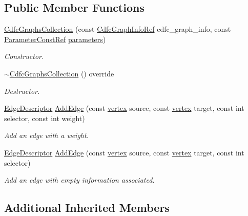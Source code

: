 \subsection*{Public Member Functions}
\begin{DoxyCompactItemize}
\item 
\hyperlink{classCdfcGraphsCollection_a20aad56ae7626fed60060372f4164f72}{Cdfc\+Graphs\+Collection} (const \hyperlink{cdfc__module__binding_8hpp_a3a026fb9b4dd23bdaed64df0cf832dd8}{Cdfc\+Graph\+Info\+Ref} cdfc\+\_\+graph\+\_\+info, const \hyperlink{Parameter_8hpp_a37841774a6fcb479b597fdf8955eb4ea}{Parameter\+Const\+Ref} \hyperlink{structgraphs__collection_adfc2ecaf0a04245a3cfd572c213ef1ed}{parameters})
\begin{DoxyCompactList}\small\item\em Constructor. \end{DoxyCompactList}\item 
\hyperlink{classCdfcGraphsCollection_a5fa5fc9fca56c45cc1e04f617cde2dc4}{$\sim$\+Cdfc\+Graphs\+Collection} () override
\begin{DoxyCompactList}\small\item\em Destructor. \end{DoxyCompactList}\item 
\hyperlink{graph_8hpp_a9eb9afea34e09f484b21f2efd263dd48}{Edge\+Descriptor} \hyperlink{classCdfcGraphsCollection_a4b3146e03cd71eb79f1f3015c3e6980f}{Add\+Edge} (const \hyperlink{graph_8hpp_abefdcf0544e601805af44eca032cca14}{vertex} source, const \hyperlink{graph_8hpp_abefdcf0544e601805af44eca032cca14}{vertex} target, const int selector, const int weight)
\begin{DoxyCompactList}\small\item\em Add an edge with a weight. \end{DoxyCompactList}\item 
\hyperlink{graph_8hpp_a9eb9afea34e09f484b21f2efd263dd48}{Edge\+Descriptor} \hyperlink{classCdfcGraphsCollection_a7d2016712fbb94f0d736c012b31f7ef3}{Add\+Edge} (const \hyperlink{graph_8hpp_abefdcf0544e601805af44eca032cca14}{vertex} source, const \hyperlink{graph_8hpp_abefdcf0544e601805af44eca032cca14}{vertex} target, const int selector)
\begin{DoxyCompactList}\small\item\em Add an edge with empty information associated. \end{DoxyCompactList}\end{DoxyCompactItemize}
\subsection*{Additional Inherited Members}


